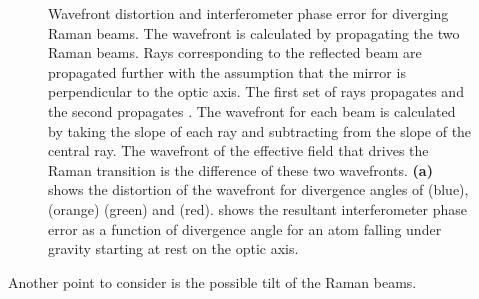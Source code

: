 \begin{figure}[!htbp]
	\centering
	\def\svgwidth{\columnwidth}
	\caption[Wavefront distortion and interferometer phase error for
  diverging Raman beams.]{Wavefront distortion and interferometer phase error for
  diverging Raman beams. The wavefront is calculated by propagating
  the two Raman beams. Rays corresponding to the reflected beam are propagated further with the assumption that the mirror is perpendicular to the optic axis. The first
		set of rays propagates  and the second propagates
		. The wavefront for each beam is calculated by
		taking the slope of each ray and subtracting from the slope of the central
		ray. The wavefront of the effective field that drives the Raman transition
    is the difference of these two wavefronts. \textbf{(a)} shows the distortion of the
		wavefront for divergence angles of
		 (blue),  (orange)
		 (green) and
     (red).  shows the resultant
    interferometer phase error as a function of divergence angle for an atom falling under gravity
    starting at rest on the optic axis.  
		}\label{fig:collimation_error_plots}
\end{figure}
\par\noindent
Another point to consider is the possible tilt of the Raman beams. 
